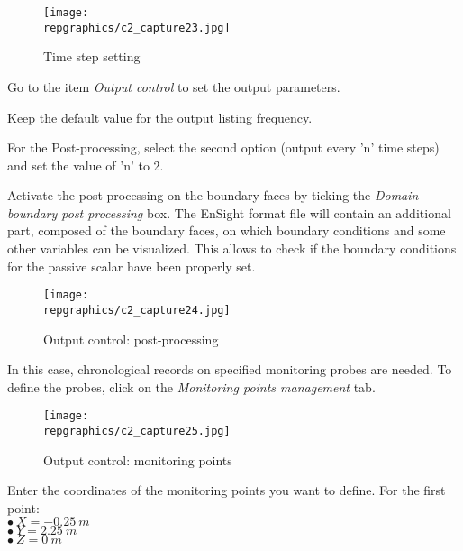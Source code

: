 \begin{figure}[h!]
\begin{center}
\texttt{[image: \\repgraphics/c2\_capture23.jpg]}
\caption{Time step setting}
\label{fig23_e2}
\end{center}
\end{figure}


\newpage
Go to the item {\itshape Output control} to set the output parameters.

Keep the default value for the output listing frequency.

For the Post-processing, select the second option (output every 'n' time steps)
and set the value of 'n' to 2.

Activate the post-processing on the boundary faces by ticking the
{\itshape Domain boundary post processing} box. The EnSight format file will
contain an additional part, composed of the boundary faces, on which boundary
conditions and some other variables can be visualized. This allows to check if
the boundary conditions for the passive scalar have been properly set.

\begin{figure}[h!]
\begin{center}
\texttt{[image: \\repgraphics/c2\_capture24.jpg]}
\caption{Output control: post-processing}
\label{fig24_e2}
\end{center}
\end{figure}


\newpage
In this case, chronological records on specified monitoring probes are needed.
To define the probes, click on the
{\itshape Monitoring points management} tab.

\begin{figure}[h!]
\begin{center}
\texttt{[image: \\repgraphics/c2\_capture25.jpg]}
\caption{Output control: monitoring points}
\label{fig25_e2}
\end{center}
\end{figure}



\newpage
Enter the coordinates of the monitoring points you want to define. For the first point:\\
\hspace*{1cm}$\bullet\ X = -0.25\ m$\\
\hspace*{1cm}$\bullet\ Y = 2.25\ m$\\
\hspace*{1cm}$\bullet\ Z = 0\ m$

